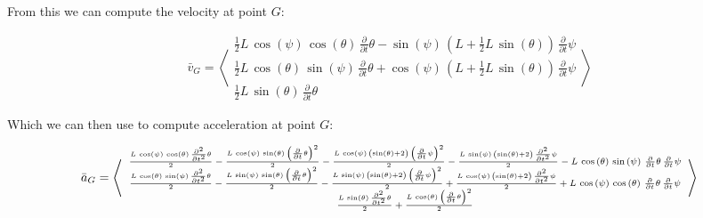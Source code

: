 \documentclass[12pt, letterpaper]{../assignment}
\begin{document}
From this we can compute the velocity at point $G$:

$$ \bar{v}_G = \left<\begin{array}{c}
  \frac{1}{2}L\,\cos\left(\psi \right)\,\cos\left(\theta \right)\,\frac{\partial }{\partial t} \theta -\sin\left(\psi \right)\,\left(L+\frac{1}{2}L\,\sin\left(\theta \right)\right)\,\frac{\partial }{\partial t} \psi \\
  \frac{1}{2}L\,\cos\left(\theta \right)\,\sin\left(\psi \right)\,\frac{\partial }{\partial t} \theta +\cos\left(\psi \right)\,\left(L+\frac{1}{2}L\,\sin\left(\theta \right)\right)\,\frac{\partial }{\partial t} \psi \\
  \frac{1}{2}L\,\sin\left(\theta \right)\,\frac{\partial }{\partial t} \theta  \end{array}\right>$$

Which we can then use to compute acceleration at point $G$:

  $$ \bar{a}_G = {\scriptsize\left<\begin{array}{c} \frac{L\,\cos\left(\psi \right)\,\cos\left(\theta \right)\,\frac{\partial ^2}{\partial t^2} \theta }{2}-\frac{L\,\cos\left(\psi \right)\,\sin\left(\theta \right)\,{\left(\frac{\partial }{\partial t} \theta \right)}^2}{2}-\frac{L\,\cos\left(\psi \right)\,\left(\sin\left(\theta \right)+2\right)\,{\left(\frac{\partial }{\partial t} \psi \right)}^2}{2}-\frac{L\,\sin\left(\psi \right)\,\left(\sin\left(\theta \right)+2\right)\,\frac{\partial ^2}{\partial t^2} \psi }{2}-L\,\cos\left(\theta \right)\,\sin\left(\psi \right)\,\frac{\partial }{\partial t} \theta \,\frac{\partial }{\partial t} \psi \\
    \frac{L\,\cos\left(\theta \right)\,\sin\left(\psi \right)\,\frac{\partial ^2}{\partial t^2} \theta }{2}-\frac{L\,\sin\left(\psi \right)\,\sin\left(\theta \right)\,{\left(\frac{\partial }{\partial t} \theta \right)}^2}{2}-\frac{L\,\sin\left(\psi \right)\,\left(\sin\left(\theta \right)+2\right)\,{\left(\frac{\partial }{\partial t} \psi \right)}^2}{2}+\frac{L\,\cos\left(\psi \right)\,\left(\sin\left(\theta \right)+2\right)\,\frac{\partial ^2}{\partial t^2} \psi }{2}+L\,\cos\left(\psi \right)\,\cos\left(\theta \right)\,\frac{\partial }{\partial t} \theta \,\frac{\partial }{\partial t} \psi \\
    \frac{L\,\sin\left(\theta \right)\,\frac{\partial ^2}{\partial t^2} \theta }{2}+\frac{L\,\cos\left(\theta \right)\,{\left(\frac{\partial }{\partial t} \theta \right)}^2}{2} \end{array}\right>}$$
  
\end{document}
